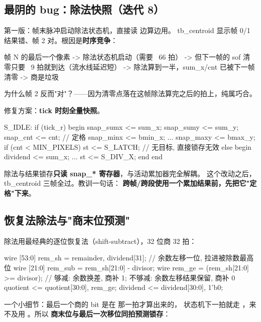 \subsection{最阴的 bug：除法快照（迭代 8）}

第一版：帧末脉冲启动除法状态机，直接读  边算边用。
tb\_centroid 显示帧 0/1 结果错、帧 2 对。根因是\textbf{时序竞争}：

\begin{Verilog}
帧 N 的最后一个像素
  -> 除法状态机启动（需要 ~66 拍）
  -> 但下一帧的 sof 清零只要 ~9 拍就到达（流水线延迟短）
  -> 除法算到一半，sum_x/cnt 已被下一帧清零 -> 商是垃圾
\end{Verilog}

为什么帧 2 反而"对"？——因为清零点落在这帧除法算完之后的拍上，纯属巧合。

修复方案：\textbf{tick 时刻全量快照}。

\begin{Verilog}
S_IDLE: if (tick_r) begin
    snap_sumx <= sum_x; snap_sumy <= sum_y; snap_cnt <= cnt;   // 定格
    snap_minx <= bmin_x; ... snap_maxy <= bmax_y;
    if (cnt < MIN_PIXELS) st <= S_LATCH;      // 无目标, 直接锁存无效
    else begin dividend <= sum_x; ... st <= S_DIV_X; end
end
\end{Verilog}

除法与结果锁存\textbf{只读 snap\_* 寄存器}，与活动累加器完全解耦。
这个改动之后，tb\_centroid 三帧全过。教训一句话：
\textbf{跨帧/跨段使用一个累加结果前，先把它"定格"下来}。

\subsection{恢复法除法与"商末位预测"}

除法用最经典的逐位恢复法（shift-subtract），32 位商 32 拍：

\begin{Verilog}
wire [53:0] rem_sh  = {remainder, dividend[31]};   // 余数左移一位, 拉进被除数最高位
wire [21:0] rem_sub = rem_sh[21:0] - divisor;
wire        rem_ge  = (rem_sh[21:0] >= divisor);
// 够减: 余数换差, 商补 1; 不够减: 余数左移结果保留, 商补 0
quotient <= {quotient[30:0], rem_ge};
dividend <= {dividend[30:0], 1'b0};
\end{Verilog}

一个小细节：最后一个商的 bit 是在  那一拍才算出来的，
状态机下一拍就走 ，来不及用 。所以
\textbf{商末位与最后一次移位同拍预测锁存}：

